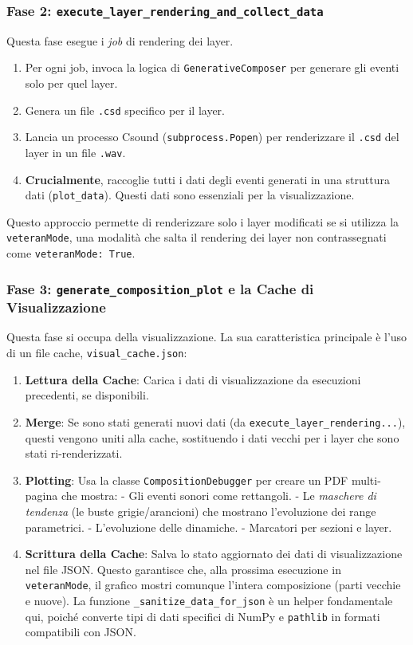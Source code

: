 \subsubsection{Fase 2: \texttt{execute\_layer\_rendering\_and\_collect\_data}}
Questa fase esegue i \textit{job} di rendering dei layer.
\begin{enumerate}
    \item Per ogni job, invoca la logica di \texttt{GenerativeComposer} per generare gli eventi solo per quel layer.
    \item Genera un file \texttt{.csd} specifico per il layer.
    \item Lancia un processo Csound (\texttt{subprocess.Popen}) per renderizzare il \texttt{.csd} del layer in un file \texttt{.wav}.
    \item \textbf{Crucialmente}, raccoglie tutti i dati degli eventi generati in una struttura dati (\texttt{plot\_data}). Questi dati sono essenziali per la visualizzazione.
\end{enumerate}
Questo approccio permette di renderizzare solo i layer modificati se si utilizza la \texttt{veteranMode}, una modalità che salta il rendering dei layer non contrassegnati come \texttt{veteranMode: True}.
\subsubsection{Fase 3: \texttt{generate\_composition\_plot} e la Cache di Visualizzazione}
Questa fase si occupa della visualizzazione. La sua caratteristica principale è l'uso di un file cache, \texttt{visual\_cache.json}:
\begin{enumerate}
    \item \textbf{Lettura della Cache}: Carica i dati di visualizzazione da esecuzioni precedenti, se disponibili.
    \item \textbf{Merge}: Se sono stati generati nuovi dati (da \texttt{execute\_layer\_rendering...}), questi vengono uniti alla cache, sostituendo i dati vecchi per i layer che sono stati ri-renderizzati.
    \item \textbf{Plotting}: Usa la classe \texttt{CompositionDebugger} per creare un PDF multi-pagina che mostra: -  Gli eventi sonori come rettangoli. -  Le \textit{maschere di tendenza} (le buste grigie/arancioni) che mostrano l'evoluzione dei range parametrici. -  L'evoluzione delle dinamiche. -  Marcatori per sezioni e layer.
    \item \textbf{Scrittura della Cache}: Salva lo stato aggiornato dei dati di visualizzazione nel file JSON. Questo garantisce che, alla prossima esecuzione in \texttt{veteranMode}, il grafico mostri comunque l'intera composizione (parti vecchie e nuove). La funzione \texttt{\_sanitize\_data\_for\_json} è un helper fondamentale qui, poiché converte tipi di dati specifici di NumPy e \texttt{pathlib} in formati compatibili con JSON.
\end{enumerate}
